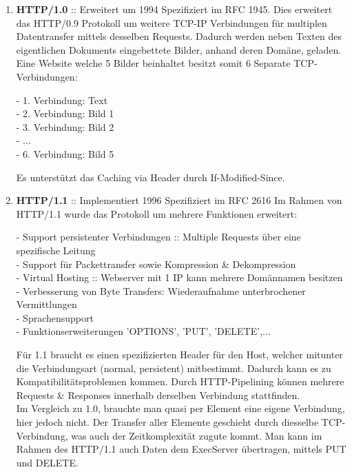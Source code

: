 \documentclass[11pt]{article}
\begin{document}
\begin{enumerate}[\thesection .1]
\begin{enumerate}[$\diamond$]
        \item \textbf{HTTP/1.0} :: Erweitert um 1994
        Spezifiziert im RFC 1945. Dies erweitert das HTTP/0.9 Protokoll um weitere TCP-IP Verbindungen für multiplen Datentransfer mittels desselben Requests.
        Dadurch werden neben Texten des eigentlichen Dokuments eingebettete Bilder, anhand deren Domäne, geladen.\\
        Eine Website welche 5 Bilder beinhaltet besitzt somit 6 Separate TCP-Verbindungen:
        \begin{addmargin}[1em]{1em}
            - 1. Verbindung: Text\\
            - 2. Verbindung: Bild 1\\
            - 3. Verbindung: Bild 2\\
            - ...\\
            - 6. Verbindung: Bild 5
        \end{addmargin}
        Es unterstützt das Caching via Header durch If-Modified-Since.\\

        \item \textbf{HTTP/1.1} :: Implementiert 1996
        Spezifiziert im RFC 2616
        Im Rahmen von HTTP/1.1 wurde das Protokoll um mehrere Funktionen erweitert:
        \begin{addmargin}[1em]{1em}
            - Support persistenter Verbindungen :: Multiple Requests über eine spezifische Leitung\\
            - Support für Packettransfer sowie Kompression \& Dekompression\\
            - Virtual Hosting :: Webserver mit 1 IP kann mehrere Domännamen besitzen\\
            - Verbesserung von Byte Transfers: Wiederaufnahme unterbrochener Vermittlungen\\
            - Sprachensupport\\
            - Funktionserweiterungen 'OPTIONS', 'PUT', 'DELETE',...
        \end{addmargin}
        Für 1.1 braucht es einen spezifizierten Header für den Host, welcher mitunter die Verbindungsart (normal, persistent) mitbestimmt.
        Dadurch kann es zu Kompatibilitätsproblemen kommen. Durch HTTP-Pipelining können mehrere Requests \& Responses innerhalb derselben Verbindung stattfinden.\\
        Im Vergleich zu 1.0, brauchte man quasi per Element eine eigene Verbindung, hier jedoch nicht. Der Transfer aller Elemente geschieht durch diesselbe TCP-Verbindung, was auch
        der Zeitkomplexität zugute kommt.
        Man kann im Rahmen des HTTP/1.1 auch Daten dem ExecServer übertragen, mittels PUT und DELETE.\\


\end{enumerate}
\end{enumerate}
\end{document}
